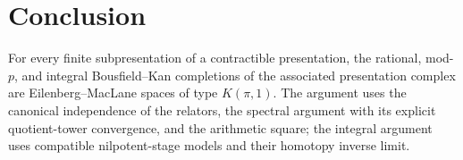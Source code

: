 \documentclass[11pt,a4paper]{article}
\begin{document}
%
%




\fi

\section*{Conclusion}
For every finite subpresentation of a contractible presentation, the rational,
mod-$p$, and integral Bousfield--Kan completions of the associated presentation
complex are Eilenberg--MacLane spaces of type $K(\pi,1)$.  The argument uses
the canonical independence of the relators, the spectral argument with its
explicit quotient-tower convergence, and the arithmetic square;
the integral argument uses compatible nilpotent-stage models and their
homotopy inverse limit.

{}

\end{document}
